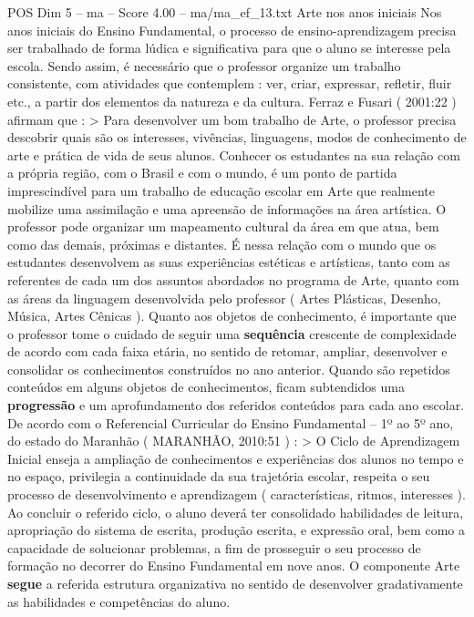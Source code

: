 \begin{textsample}{POS Dim 5 – ma – Score 4.00 – ma/ma\_ef\_13.txt}  \label{ex:f5_pos_179}
Arte nos anos iniciais Nos anos iniciais do Ensino Fundamental, o processo de ensino-aprendizagem precisa ser trabalhado de forma lúdica e significativa para que o aluno se interesse pela escola.
Sendo assim, é necessário que o professor organize um trabalho consistente, com atividades que contemplem : ver, criar, expressar, refletir, fluir etc., a partir dos elementos da natureza e da cultura.
Ferraz e Fusari ( 2001:22 ) afirmam que : > Para desenvolver um bom trabalho de Arte, o professor precisa descobrir quais são os interesses, vivências, linguagens, modos de conhecimento de arte e prática de vida de seus alunos.
Conhecer os estudantes na sua relação com a própria região, com o Brasil e com o mundo, é um ponto de partida imprescindível para um trabalho de educação escolar em Arte que realmente mobilize uma assimilação e uma apreensão de informações na área artística.
O professor pode organizar um mapeamento cultural da área em que atua, bem como das demais, próximas e distantes.
É nessa relação com o mundo que os estudantes desenvolvem as suas experiências estéticas e artísticas, tanto com as referentes de cada um dos assuntos abordados no programa de Arte, quanto com as áreas da linguagem desenvolvida pelo professor ( Artes Plásticas, Desenho, Música, Artes Cênicas ).
Quanto aos objetos de conhecimento, é importante que o professor tome o cuidado de seguir uma \textbf{sequência} crescente de complexidade de acordo com cada faixa etária, no sentido de retomar, ampliar, desenvolver e consolidar os conhecimentos construídos no ano anterior.
Quando são repetidos conteúdos em alguns objetos de conhecimentos, ficam subtendidos uma \textbf{progressão} e um aprofundamento dos referidos conteúdos para cada ano escolar.
De acordo com o Referencial Curricular do Ensino Fundamental – 1º ao 5º ano, do estado do Maranhão ( MARANHÃO, 2010:51 ) : > O Ciclo de Aprendizagem Inicial enseja a ampliação de conhecimentos e experiências dos alunos no tempo e no espaço, privilegia a continuidade da sua trajetória escolar, respeita o seu processo de desenvolvimento e aprendizagem ( características, ritmos, interesses ).
Ao concluir o referido ciclo, o aluno deverá ter consolidado habilidades de leitura, apropriação do sistema de escrita, produção escrita, e expressão oral, bem como a capacidade de solucionar problemas, a fim de prosseguir o seu processo de formação no decorrer do Ensino Fundamental em nove anos.
O componente Arte \textbf{segue} a referida estrutura organizativa no sentido de desenvolver gradativamente as habilidades e competências do aluno.

\end{textsample}
